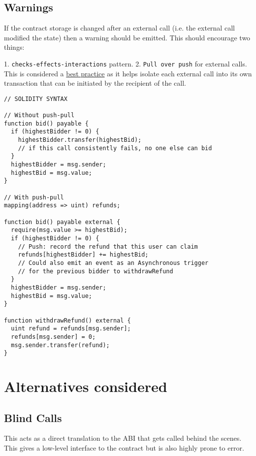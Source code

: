 \subsection{Warnings}

If the contract storage is changed after an external call (i.e. the external call modified the state) then a warning should be emitted. This should encourage two things:

1. \texttt{checks-effects-interactions} pattern.
2. \texttt{Pull over push} for external calls. This is considered a \href{https://consensys.github.io/smart-contract-best-practices/recommendations/#favor-pull-over-push-for-external-calls}{best practice} as it helps isolate each external call into its own transaction that can be initiated by the recipient of the call.

\begin{verbatim}
// SOLIDITY SYNTAX

// Without push-pull
function bid() payable {
  if (highestBidder != 0) {
    highestBidder.transfer(highestBid);
    // if this call consistently fails, no one else can bid
  }
  highestBidder = msg.sender;
  highestBid = msg.value;
}

// With push-pull
mapping(address => uint) refunds;

function bid() payable external {
  require(msg.value >= highestBid);
  if (highestBidder != 0) {
    // Push: record the refund that this user can claim
    refunds[highestBidder] += highestBid;
    // Could also emit an event as an Asynchronous trigger
    // for the previous bidder to withdrawRefund
  }
  highestBidder = msg.sender;
  highestBid = msg.value;
}

function withdrawRefund() external {
  uint refund = refunds[msg.sender];
  refunds[msg.sender] = 0;
  msg.sender.transfer(refund);
}
\end{verbatim}

\section{Alternatives considered}

\subsection{Blind Calls}

This acts as a direct translation to the ABI that gets called behind the scenes. This gives a low-level interface to the contract but is also highly prone to error.

